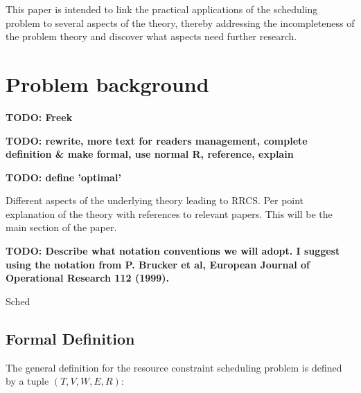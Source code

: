\documentclass{article}
\newcommand{\TODO}[1]{{\color{red}\textbf{TODO: #1}}}
\begin{document}
This paper is intended to link the practical applications of the scheduling problem to several aspects of the theory, thereby addressing the incompleteness of the problem theory and discover what aspects need further research.

\newpage

\section{Problem background}
\TODO{Freek}

\TODO{rewrite, more text for readers management, complete definition \& make formal, use normal R, reference, explain}

\TODO{define 'optimal'}

Different aspects of the underlying theory leading to RRCS.
 Per point explanation of the theory with references to relevant papers.
This will be the main section of the paper.

\TODO{Describe what notation conventions we will adopt.
I suggest using the notation from P. Brucker et al, European Journal of Operational Research 112 (1999). }

Sched
\subsection{Formal Definition}
The general definition for the resource constraint scheduling problem is defined by a tuple $(T, V, W, E, R)$: \cite{brucker99}
\end{document}
